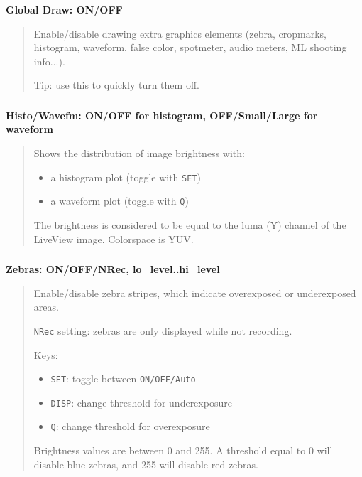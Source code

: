 \documentclass[a4paper,english]{article}
\begin{document}
\textbf{Global Draw: ON/OFF}
%
\begin{quote}

Enable/disable drawing extra graphics elements
(zebra, cropmarks, histogram, waveform, false color, spotmeter, audio meters, ML shooting info...).

Tip: use this to quickly turn them off.

\end{quote}
\vspace{-10mm}\subsubsection*{}\label{histogram}\vspace{-10mm}\subsubsection*{}\label{waveform}
\textbf{Histo/Wavefm: ON/OFF for histogram, OFF/Small/Large for waveform}
%
\begin{quote}

Shows the distribution of image brightness with:
%
\begin{itemize}

\item a histogram plot (toggle with \texttt{SET})

\item a waveform plot (toggle with \texttt{Q})

\end{itemize}

The brightness is considered to be equal to the luma (Y) channel of the LiveView image. Colorspace is YUV.

\end{quote}
\vspace{-10mm}\subsubsection*{}\label{zebras}
\textbf{Zebras: ON/OFF/NRec, lo\_level..hi\_level}
%
\begin{quote}

Enable/disable zebra stripes, which indicate overexposed or underexposed areas.

\texttt{NRec} setting: zebras are only displayed while not recording.

Keys:
%
\begin{itemize}

\item \texttt{SET}: toggle between \texttt{ON/OFF/Auto}

\item \texttt{DISP}: change threshold for underexposure

\item \texttt{Q}: change threshold for overexposure

\end{itemize}

Brightness values are between 0 and 255. A threshold equal to 0 will disable blue zebras, and 255 will disable red zebras.

\end{quote}
\end{document}
